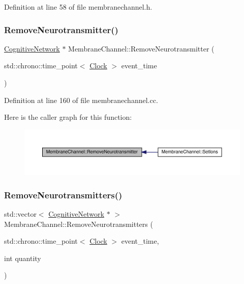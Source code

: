 Definition at line 58 of file membranechannel.\+h.

\mbox{\label{class_membrane_channel_a2252f222f4a41bf1975dc856569e0a22}} 
\subsubsection{\texorpdfstring{Remove\+Neurotransmitter()}{RemoveNeurotransmitter()}}
{\footnotesize\ttfamily \hyperlink{class_cognitive_network}{Cognitive\+Network} $\ast$ Membrane\+Channel\+::\+Remove\+Neurotransmitter (\begin{DoxyParamCaption}\item[{std\+::chrono\+::time\+\_\+point$<$ \hyperlink{universe_8h_a0ef8d951d1ca5ab3cfaf7ab4c7a6fd80}{Clock} $>$}]{event\+\_\+time }\end{DoxyParamCaption})}



Definition at line 160 of file membranechannel.\+cc.

Here is the caller graph for this function\+:\nopagebreak
\begin{figure}[H]
\begin{center}
\leavevmode
\includegraphics[width=350pt]{class_membrane_channel_a2252f222f4a41bf1975dc856569e0a22_icgraph}
\end{center}
\end{figure}
\mbox{\label{class_membrane_channel_a37f22ddd877e3be7b353048149a7bbcd}} 
\subsubsection{\texorpdfstring{Remove\+Neurotransmitters()}{RemoveNeurotransmitters()}}
{\footnotesize\ttfamily std\+::vector$<$ \hyperlink{class_cognitive_network}{Cognitive\+Network} $\ast$ $>$ Membrane\+Channel\+::\+Remove\+Neurotransmitters (\begin{DoxyParamCaption}\item[{std\+::chrono\+::time\+\_\+point$<$ \hyperlink{universe_8h_a0ef8d951d1ca5ab3cfaf7ab4c7a6fd80}{Clock} $>$}]{event\+\_\+time,  }\item[{int}]{quantity }\end{DoxyParamCaption})}



